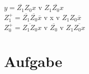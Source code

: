 \documentclass[ngerman,12pt,parskip=half]{scrartcl}
\begin{document}
\vspace{1,5 cm}

\subsection{}
$y=\overline{Z_{1}}Z_{0}x$ v $Z_{1}\overline{Z_{0}}x$ \\
$Z^+_{1}= \overline{Z_{1}}\overline{Z_{0}}\overline{x}$ v x v $Z_{1}Z_0\overline{x}$ \\
$Z^+_{0}=\overline{Z_{1}Z_{0}}x$ v $\overline{Z_{0}}$ v $Z_{1}\overline{Z_{0}x}$

\clearpage

\section{Aufgabe} 
\end{document}
